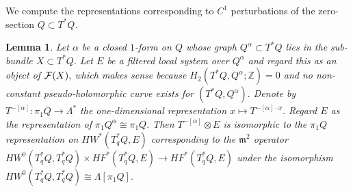 \documentclass{article}
\theoremstyle{plain}%
\newtheorem{lem}[thm]{Lemma}
\theoremstyle{definition}
\numberwithin{equation}{section}
\numberwithin{figure}{section}
\def\l{\label}
\def\fm{{\mathfrak m}}
\def\cF{{\mathbin{\cal F}}}
\def\Z{{\mathbin{\mathbb Z}}}
\def\al{\alpha}
\def\La{\Lambda}
\def\ot{\otimes}
\begin{document}
We compute the representations corresponding to $C^1$ perturbations of the zero-section $Q\subset T^*Q.$
\begin{lem}\l{lem: smooth deformations}
Let $\al$ be a closed $1$-form on $Q$ whose graph $Q^\al\subset T^*Q$ lies in the sub-bundle $X\subset T^*Q.$
Let $E$ be a filtered local system over $Q^\al$ and regard this as an object of $\cF(X),$ which makes sense because $H_2(T^*Q,Q^\al;\Z)=0$ and no non-constant pseudo-holomorphic curve exists for $(T^*Q,Q^\al).$
Denote by $T^{-[\al]}:\pi_1Q\to\La^*$ the one-dimensional representation $x\mapsto T^{-[\al]\cdot x}.$
Regard $E$ as the representation of $\pi_1Q^\al\cong\pi_1Q.$
Then $T^{-[\al]}\ot E$ is isomorphic to the $\pi_1Q$ representation on $HW^*(T_q^*Q,E)$ corresponding to the $\fm^2$ operator $HW^0(T_q^*Q,T_q^*Q)\times HF^*(T_q^*Q,E)\to HF^*(T_q^*Q,E)$ under the isomorphism $HW^0(T_q^*Q,T_q^*Q)\cong\La[\pi_1Q].$
\end{lem}
\end{document}
